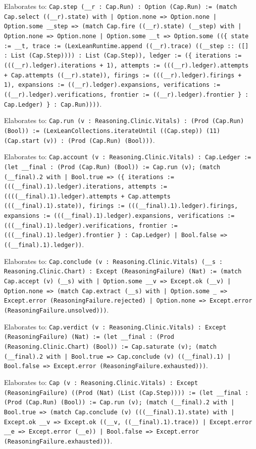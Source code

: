 \documentclass[11pt]{article}
\begin{document}
\noindent Elaborates to: \texttt{Cap.step (\_\_r : Cap.Run) : Option (Cap.Run) := (match Cap.select ((\_\_r).state) with | Option.none => Option.none | Option.some \_\_step => (match Cap.fire ((\_\_r).state) (\_\_step) with | Option.none => Option.none | Option.some \_\_t => Option.some ((\{ state := \_\_t, trace := (LexLeanRuntime.append ((\_\_r).trace) ((\_\_step :: ([] : List (Cap.Step)))) : List (Cap.Step)), ledger := (\{ iterations := (((\_\_r).ledger).iterations + 1), attempts := (((\_\_r).ledger).attempts + Cap.attempts ((\_\_r).state)), firings := (((\_\_r).ledger).firings + 1), expansions := ((\_\_r).ledger).expansions, verifications := ((\_\_r).ledger).verifications, frontier := ((\_\_r).ledger).frontier \} : Cap.Ledger) \} : Cap.Run))))}.\par
\noindent Elaborates to: \texttt{Cap.run (v : Reasoning.Clinic.Vitals) : (Prod (Cap.Run) (Bool)) := (LexLeanCollections.iterateUntil ((Cap.step)) (11) (Cap.start (v)) : (Prod (Cap.Run) (Bool)))}.\par
\noindent Elaborates to: \texttt{Cap.account (v : Reasoning.Clinic.Vitals) : Cap.Ledger := (let \_\_final : (Prod (Cap.Run) (Bool)) := Cap.run (v); (match (\_\_final).2 with | Bool.true => (\{ iterations := (((\_\_final).1).ledger).iterations, attempts := ((((\_\_final).1).ledger).attempts + Cap.attempts (((\_\_final).1).state)), firings := (((\_\_final).1).ledger).firings, expansions := (((\_\_final).1).ledger).expansions, verifications := (((\_\_final).1).ledger).verifications, frontier := (((\_\_final).1).ledger).frontier \} : Cap.Ledger) | Bool.false => ((\_\_final).1).ledger))}.\par
\noindent Elaborates to: \texttt{Cap.conclude (v : Reasoning.Clinic.Vitals) (\_\_s : Reasoning.Clinic.Chart) : Except (ReasoningFailure) (Nat) := (match Cap.accept (v) (\_\_s) with | Option.some \_\_v => Except.ok (\_\_v) | Option.none => (match Cap.extract (\_\_s) with | Option.some \_ => Except.error (ReasoningFailure.rejected) | Option.none => Except.error (ReasoningFailure.unsolved)))}.\par
\noindent Elaborates to: \texttt{Cap.verdict (v : Reasoning.Clinic.Vitals) : Except (ReasoningFailure) (Nat) := (let \_\_final : (Prod (Reasoning.Clinic.Chart) (Bool)) := Cap.saturate (v); (match (\_\_final).2 with | Bool.true => Cap.conclude (v) ((\_\_final).1) | Bool.false => Except.error (ReasoningFailure.exhausted)))}.\par
\noindent Elaborates to: \texttt{Cap (v : Reasoning.Clinic.Vitals) : Except (ReasoningFailure) ((Prod (Nat) (List (Cap.Step)))) := (let \_\_final : (Prod (Cap.Run) (Bool)) := Cap.run (v); (match (\_\_final).2 with | Bool.true => (match Cap.conclude (v) (((\_\_final).1).state) with | Except.ok \_\_v => Except.ok ((\_\_v, ((\_\_final).1).trace)) | Except.error \_\_e => Except.error (\_\_e)) | Bool.false => Except.error (ReasoningFailure.exhausted)))}.\par
\end{document}
